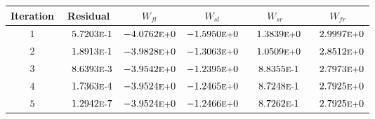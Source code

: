 \begin{tabular*}{\textwidth}{@{\extracolsep{\fill}} cccccc}
\\ 
\hline 
\hline 
Iteration & Residual & $W_{fl}$ & $W_{sl}$ & $W_{sr}$ & $W_{fr}$ \\ 
\hline 
$1$ & $\phantom{-} 5.7203\mbox{\sc{e}\smaller{-}}1$ & $-4.0762\mbox{\sc{e}\smaller{+}}0$ & $-1.5950\mbox{\sc{e}\smaller{+}}0$ & $\phantom{-} 1.3839\mbox{\sc{e}\smaller{+}}0$ & $\phantom{-} 2.9997\mbox{\sc{e}\smaller{+}}0$ \\ 
$2$ & $\phantom{-} 1.8913\mbox{\sc{e}\smaller{-}}1$ & $-3.9828\mbox{\sc{e}\smaller{+}}0$ & $-1.3063\mbox{\sc{e}\smaller{+}}0$ & $\phantom{-} 1.0509\mbox{\sc{e}\smaller{+}}0$ & $\phantom{-} 2.8512\mbox{\sc{e}\smaller{+}}0$ \\ 
$3$ & $\phantom{-} 8.6393\mbox{\sc{e}\smaller{-}}3$ & $-3.9542\mbox{\sc{e}\smaller{+}}0$ & $-1.2395\mbox{\sc{e}\smaller{+}}0$ & $\phantom{-} 8.8355\mbox{\sc{e}\smaller{-}}1$ & $\phantom{-} 2.7973\mbox{\sc{e}\smaller{+}}0$ \\ 
$4$ & $\phantom{-} 1.7363\mbox{\sc{e}\smaller{-}}4$ & $-3.9524\mbox{\sc{e}\smaller{+}}0$ & $-1.2465\mbox{\sc{e}\smaller{+}}0$ & $\phantom{-} 8.7248\mbox{\sc{e}\smaller{-}}1$ & $\phantom{-} 2.7925\mbox{\sc{e}\smaller{+}}0$ \\ 
$5$ & $\phantom{-} 1.2942\mbox{\sc{e}\smaller{-}}7$ & $-3.9524\mbox{\sc{e}\smaller{+}}0$ & $-1.2466\mbox{\sc{e}\smaller{+}}0$ & $\phantom{-} 8.7262\mbox{\sc{e}\smaller{-}}1$ & $\phantom{-} 2.7925\mbox{\sc{e}\smaller{+}}0$ \\ 
\hline 
\end{tabular*} 

